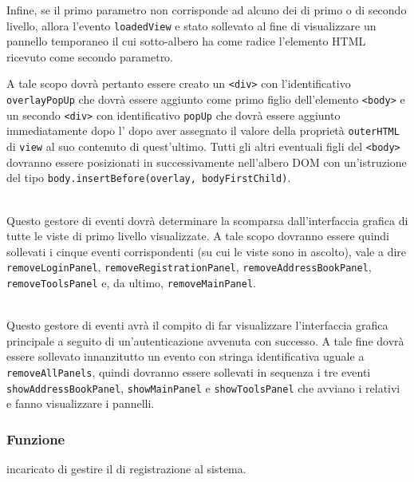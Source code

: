 \begin{description}
Infine, se il primo parametro non corrisponde ad alcuno dei  di primo o di secondo livello, allora l'evento \verb'loadedView' e stato sollevato al fine di visualizzare un pannello temporaneo il cui sotto-albero ha come radice l'elemento HTML ricevuto come secondo parametro.

A tale scopo dovrà pertanto essere creato un \verb'<div>' con l'identificativo \verb'overlayPopUp' che dovrà essere aggiunto come primo figlio dell'elemento \verb'<body>' e un secondo \verb'<div>' con identificativo \verb'popUp' che dovrà essere aggiunto immediatamente dopo l' dopo aver assegnato il valore della proprietà \verb'outerHTML' di \verb'view' al suo contenuto di quest'ultimo. Tutti gli altri eventuali figli del \verb'<body>' dovranno essere posizionati in successivamente nell'albero DOM con un'istruzione del tipo \verb'body.insertBefore(overlay, bodyFirstChild)'.

\item{}\\
Questo gestore di eventi dovrà determinare la scomparsa dall'interfaccia grafica di tutte le viste di primo livello visualizzate. A tale scopo dovranno essere quindi sollevati i cinque eventi corrispondenti (su cui le viste sono in ascolto), vale a dire \verb'removeLoginPanel', \verb'removeRegistrationPanel', \verb'removeAddressBookPanel', \verb'removeToolsPanel' e, da ultimo, \verb'removeMainPanel'.

\item{}\\
Questo gestore di eventi avrà il compito di far visualizzare l'interfaccia grafica principale a seguito di un'autenticazione avvenuta con successo. A tale fine dovrà essere sollevato innanzitutto un evento con stringa identificativa uguale a \verb'removeAllPanels', quindi dovranno essere sollevati in sequenza i tre eventi \verb'showAddressBookPanel', \verb'showMainPanel' e \verb'showToolsPanel' che avviano i relativi  e fanno visualizzare i pannelli.

\end{description}



\subsubsection*{Funzione}
 incaricato di gestire il  di registrazione al sistema.

